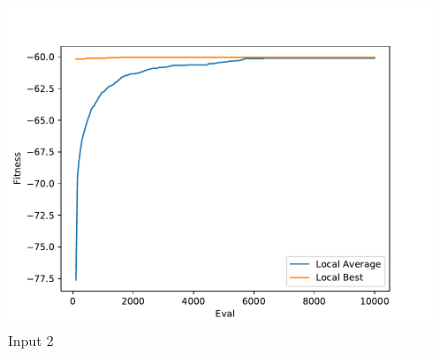 \documentclass{standalone}
\begin{document}
\begin{figure}[!htb]
	\caption{Input 2}
	\label{fig:graph_2003}
	\includegraphics[width=\textwidth]{../graphs/graphs/2003.pdf}
\end{figure}
\end{document}
